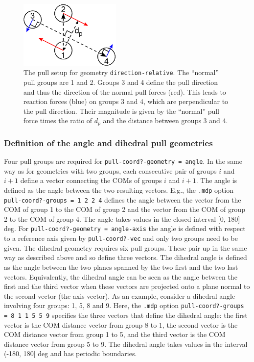 \begin{figure}
\centerline{\includegraphics[width=5cm]{plots/pulldirrel}}
\caption{The pull setup for geometry {\tt direction-relative}. The ``normal'' pull groups are 1 and 2. Groups 3 and 4 define the pull direction and thus the direction of the normal pull forces (red). This leads to reaction forces (blue) on groups 3 and 4, which are perpendicular to the pull direction. Their magnitude is given by the ``normal'' pull force times the ratio of $d_p$ and the distance between groups 3 and 4.}
\label{fig:pulldirrel} 
\end{figure}   

\subsubsection{Definition of the angle and dihedral pull geometries}
Four pull groups are required for {\tt pull-coord?-geometry = angle}. In the same way as for geometries with two groups, each consecutive pair of groups
$i$ and $i+1$ define a vector connecting the COMs of groups $i$ and $i+1$. The angle is defined as the angle between the two resulting vectors.
E.g., the {\tt .mdp} option {\tt pull-coord?-groups = 1 2 2 4} defines the angle between the vector from the COM of group 1 to the COM of group 2
and the vector from the COM of group 2 to the COM of group 4.
The angle takes values in the closed interval [0, 180] deg.
For {\tt pull-coord?-geometry = angle-axis} the angle is defined with respect to a reference axis given by {\tt pull-coord?-vec} and only two groups need to be given.
The dihedral geometry requires six pull groups. These pair up in the same way as described above and so define three vectors. The dihedral angle is defined as the angle between the two
planes spanned by the two first and the two last vectors. Equivalently, the dihedral angle can be seen as the angle between the first and the third
vector when these vectors are projected onto a plane normal to the second vector (the axis vector).
As an example, consider a dihedral angle involving four groups: 1, 5, 8 and 9. Here, the {\tt .mdp} option
{\tt pull-coord?-groups = 8 1 1 5 5 9} specifies the three vectors that define the dihedral angle:
the first vector is the COM distance vector from group 8 to 1, the second vector is the COM distance vector from group 1 to 5, and the third vector is the COM distance vector from group 5 to 9.
The dihedral angle takes values in the interval (-180, 180] deg and has periodic boundaries.


